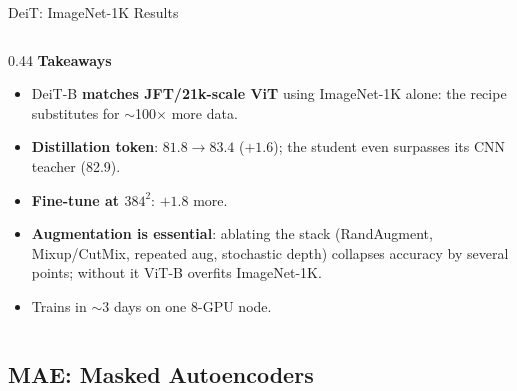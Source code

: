 \begin{frame}{DeiT: ImageNet-1K Results}
\begin{columns}[T]
\begin{column}{0.44\textwidth}
      \textbf{Takeaways}
      \begin{itemize}
        \item DeiT-B \textbf{matches JFT/21k-scale ViT} using ImageNet-1K alone: the recipe substitutes for $\sim$100$\times$ more data.
        \item \textbf{Distillation token}: $81.8 \rightarrow 83.4$ ($+1.6$); the student even surpasses its CNN teacher (82.9).
        \item \textbf{Fine-tune at $384^2$}: $+1.8$ more.
        \item \textbf{Augmentation is essential}: ablating the stack (RandAugment, Mixup/CutMix, repeated aug, stochastic depth) collapses accuracy by several points; without it ViT-B overfits ImageNet-1K.
        \item Trains in $\sim$3 days on one 8-GPU node.
      \end{itemize}
    \end{column}
  \end{columns}
\end{frame}

\subsection{MAE: Masked Autoencoders}


